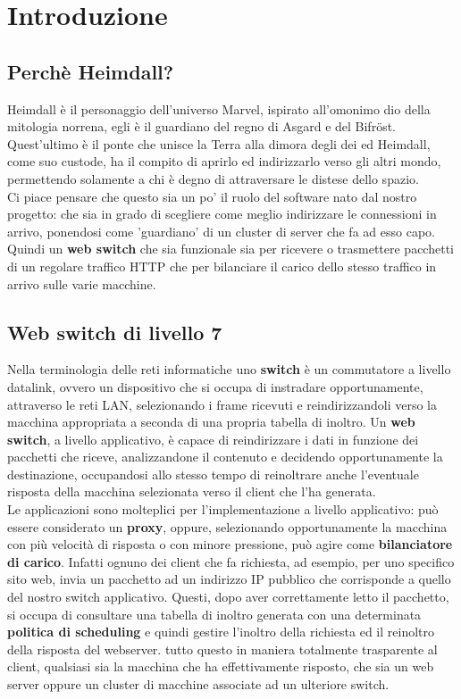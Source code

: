 \documentclass[italian]{tktltiki2}
\begin{document}
\newpage
\section{Introduzione}

\subsection{Perchè Heimdall?}
Heimdall è il personaggio dell'universo Marvel, ispirato all'omonimo dio della mitologia norrena, egli è il guardiano del regno di Asgard e del Bifröst. Quest'ultimo è il ponte che unisce la Terra alla dimora degli dei ed Heimdall, come suo custode, ha il compito di aprirlo ed indirizzarlo verso gli altri mondo, permettendo solamente a chi è degno di attraversare le distese dello spazio. \\
Ci piace pensare che questo sia un po' il ruolo del software nato dal nostro progetto: che sia in grado di scegliere come meglio indirizzare le connessioni in arrivo, ponendosi come 'guardiano' di un cluster di server che fa ad esso capo. Quindi un \textbf{web switch} che sia funzionale sia per ricevere o trasmettere pacchetti di un regolare traffico HTTP che per bilanciare il carico dello stesso traffico in arrivo sulle varie macchine.

\subsection{Web switch di livello 7}
Nella terminologia delle reti informatiche uno \textbf{switch} è un commutatore a livello datalink, ovvero un dispositivo che si occupa di instradare opportunamente, attraverso le reti LAN, selezionando i frame ricevuti e reindirizzandoli verso la macchina appropriata a seconda di una propria tabella di inoltro. Un \textbf{web switch}, a livello applicativo, è capace di reindirizzare i dati in funzione dei pacchetti che riceve, analizzandone il contenuto e decidendo opportunamente la destinazione, occupandosi allo stesso tempo di reinoltrare anche l'eventuale risposta della macchina selezionata verso il client che l'ha generata. \\
Le applicazioni sono molteplici per l'implementazione a livello applicativo: può essere considerato un \textbf{proxy}, oppure, selezionando opportunamente la macchina con più velocità di risposta o con minore pressione, può agire come \textbf{bilanciatore di carico}. Infatti ognuno dei client che fa richiesta, ad esempio, per uno specifico sito web, invia un pacchetto ad un indirizzo IP pubblico che corrisponde a quello del nostro switch applicativo. Questi, dopo aver correttamente letto il pacchetto, si occupa di consultare una tabella di inoltro generata con una determinata \textbf{politica di scheduling} e quindi gestire l'inoltro della richiesta ed il reinoltro della risposta del webserver. tutto questo in maniera totalmente trasparente al client, qualsiasi sia la macchina che ha effettivamente risposto, che sia un web server oppure un cluster di macchine associate ad un ulteriore switch.
\end{document}

